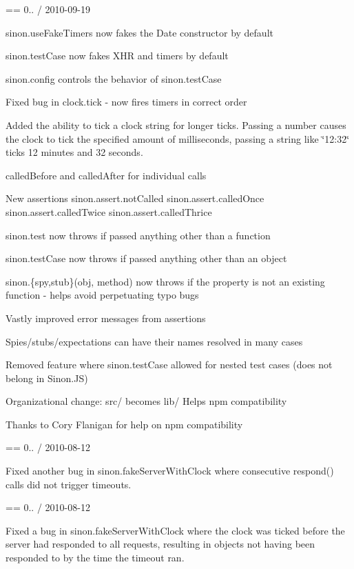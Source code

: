 == 0.. / 2010-\/09-\/19
\begin{DoxyItemize}
\item sinon.\+use\+Fake\+Timers now fakes the Date constructor by default
\item sinon.\+test\+Case now fakes X\+HR and timers by default
\item sinon.\+config controls the behavior of sinon.\+test\+Case
\item Fixed bug in clock.\+tick -\/ now fires timers in correct order
\item Added the ability to tick a clock string for longer ticks. Passing a number causes the clock to tick the specified amount of milliseconds, passing a string like \char`\"{}12\+:32\char`\"{} ticks 12 minutes and 32 seconds.
\item called\+Before and called\+After for individual calls
\item New assertions sinon.\+assert.\+not\+Called sinon.\+assert.\+called\+Once sinon.\+assert.\+called\+Twice sinon.\+assert.\+called\+Thrice
\item sinon.\+test now throws if passed anything other than a function
\item sinon.\+test\+Case now throws if passed anything other than an object
\item sinon.\{spy,stub\}(obj, method) now throws if the property is not an existing function -\/ helps avoid perpetuating typo bugs
\item Vastly improved error messages from assertions
\item Spies/stubs/expectations can have their names resolved in many cases
\item Removed feature where sinon.\+test\+Case allowed for nested test cases (does not belong in Sinon.\+JS)
\item Organizational change\+: src/ becomes lib/ Helps npm compatibility
\item Thanks to Cory Flanigan for help on npm compatibility
\end{DoxyItemize}

== 0.. / 2010-\/08-\/12
\begin{DoxyItemize}
\item Fixed another bug in sinon.\+fake\+Server\+With\+Clock where consecutive respond() calls did not trigger timeouts.
\end{DoxyItemize}

== 0.. / 2010-\/08-\/12
\begin{DoxyItemize}
\item Fixed a bug in sinon.\+fake\+Server\+With\+Clock where the clock was ticked before the server had responded to all requests, resulting in objects not having been responded to by the time the timeout ran.
\end{DoxyItemize}


